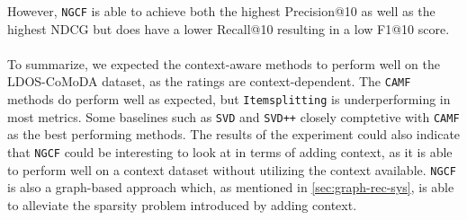However, \texttt{NGCF} is able to achieve both the highest Precision@10 as well as the highest NDCG but does have a lower Recall@10 resulting in a low F1@10 score.
\\\\
To summarize, we expected the context-aware methods to perform well on the LDOS-CoMoDA dataset, as the ratings are context-dependent. 
The \texttt{CAMF} methods do perform well as expected, but \texttt{Itemsplitting} is underperforming in most metrics.
Some baselines such as \texttt{SVD} and \texttt{SVD++} closely comptetive with \texttt{CAMF} as the best performing methods.
The results of the experiment could also indicate that \texttt{NGCF} could be interesting to look at in terms of adding context, as it is able to perform well on a context dataset without utilizing the context available. 
\texttt{NGCF} is also a graph-based approach which, as mentioned in \autoref{sec:graph-rec-sys}, is able to alleviate the sparsity problem introduced by adding context.
